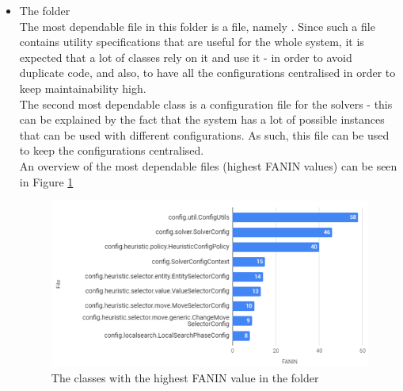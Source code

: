 \begin{itemize}
        
        \item The  folder\\
        The most dependable file in this folder is a  file, namely  . Since such a file contains utility specifications that are useful for the whole system, it is expected that a lot of classes rely on it and use it - in order to avoid duplicate code, and also, to have all the configurations centralised in order to keep maintainability high. \\
        The second most dependable class is a configuration file for the solvers - this can be explained by the fact that the system has a lot of possible  instances that can be used with different configurations. As such, this  file can be used to keep the configurations centralised. \\
        An overview of the most dependable files (highest FANIN values) can be seen in Figure \ref{fig:faninconfig}
        \begin{figure}[H]
            \centering
            \includegraphics[scale=0.8]{figures/step4/step4.2/FANIN_config.PNG}
            \caption{The classes with the highest FANIN value in the  folder}
            \label{fig:faninconfig}
        \end{figure}
        

\end{itemize}
